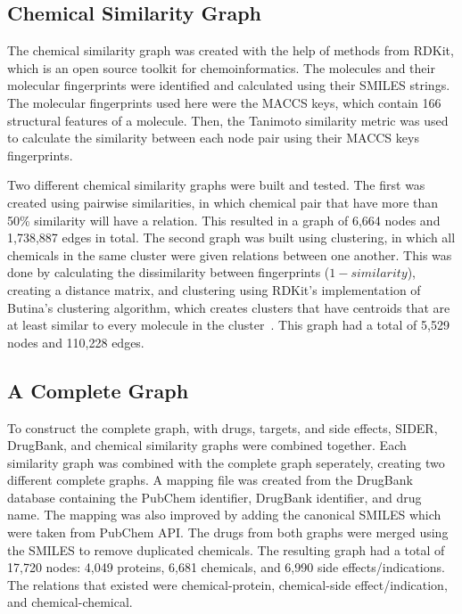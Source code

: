 \subsection{Chemical Similarity Graph}

The chemical similarity graph was created with the help of methods from RDKit, which is an open source toolkit for chemoinformatics.
The molecules and their molecular fingerprints were identified and calculated using their \ac{SMILES} strings.
The molecular fingerprints used here were the MACCS keys, which contain 166 structural features of a molecule.
Then, the Tanimoto similarity metric was used to calculate the similarity between each node pair using their MACCS keys fingerprints.

Two different chemical similarity graphs were built and tested.
The first was created using pairwise similarities, in which chemical pair that have more than 50\% similarity will have a relation.
This resulted in a graph of 6,664 nodes and 1,738,887 edges in total.
The second graph was built using clustering, in which all chemicals in the same cluster were given relations between one another.
This was done by calculating the dissimilarity between fingerprints ($1 - similarity$), creating a distance matrix, and clustering using RDKit's implementation of Butina's clustering algorithm, which creates clusters that have centroids that are at least similar to every molecule in the cluster~\cite{butina_unsupervised_1999}.
This graph had a total of 5,529 nodes and 110,228 edges.

\subsection{A Complete Graph}

To construct the complete graph, with drugs, targets, and side effects, \ac{SIDER}, DrugBank, and chemical similarity graphs were combined together.
Each similarity graph was combined with the complete graph seperately, creating two different complete graphs.
A mapping file was created from the DrugBank database containing the PubChem identifier, DrugBank identifier, and drug name.
The mapping was also improved by adding the canonical \ac{SMILES} which were taken from PubChem API\@.
The drugs from both graphs were merged using the SMILES to remove duplicated chemicals.
The resulting graph had a total of 17,720 nodes: 4,049 proteins, 6,681 chemicals, and 6,990 side effects/indications.
The relations that existed were chemical-protein, chemical-side effect/indication, and chemical-chemical.

